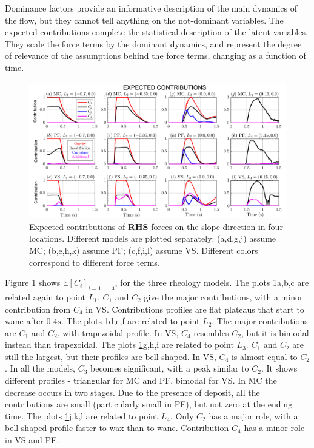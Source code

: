 \documentclass{article}
\begin{document}
Dominance factors provide an informative description of the main dynamics of the flow, but they cannot tell anything on the not-dominant variables. The expected contributions complete the statistical description of the latent variables. They scale the force terms by the dominant dynamics, and represent the degree of relevance of the assumptions behind the force terms, changing as a function of time.
\begin{figure}[H]
         \centering
        \includegraphics[width=1\textwidth]{InclinedPlane/ForceContrib/Ci_x.png}
        \caption{Expected contributions of \textbf{RHS} forces on the slope direction in four locations. Different models are plotted separately: (a,d,g,j) assume MC; (b,e,h,k) assume PF; (c,f,i,l) assume VS. Different colors correspond to different force terms.}
        \label{fig:Ramp-Ci_x}
\end{figure}
Figure \ref{fig:Ramp-Ci_x} shows $\mathbb E[C_i]_{i=1,\dots,4}$, for the three rheology models. The plots \ref{fig:Ramp-Ci_x}a,b,c are related again to point $L_1$. $C_1$ and $C_2$ give the major contributions, with a minor contribution from $C_4$ in VS. Contributions profiles are flat plateaus that start to wane after $0.4 s$. The plots \ref{fig:Ramp-Ci_x}d,e,f are related to point $L_2$. The major contributions are $C_1$ and $C_2$, with trapezoidal profile. In VS, $C_4$ resembles $C_2$, but it is bimodal instead than trapezoidal. The plots \ref{fig:Ramp-Ci_x}g,h,i are related to point $L_3$. $C_1$ and $C_2$ are still the largest, but their profiles are bell-shaped. In VS, $C_4$ is almost equal to $C_2$. In all the models, $C_3$ becomes significant, with a peak similar to $C_2$. It shows different profiles - triangular for MC and PF, bimodal for VS. In MC the decrease occurs in two stages. Due to the presence of deposit, all the contributions are small (particularly small in PF), but not zero at the ending time. The plots \ref{fig:Ramp-Ci_x}j,k,l are related to point $L_4$. Only $C_2$ has a major role, with a bell shaped profile faster to wax than to wane. Contribution $C_4$ has a minor role in VS and PF.
\newpage
\end{document}
